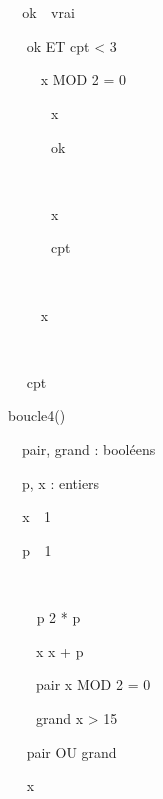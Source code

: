 {\sffamily
\texttt{\ \ }ok\texttt{
}\texttt{ }vrai}

{\sffamily
\ \  ok ET cpt {\textless} 3
}

{\sffamily
\ \ \ \  x MOD 2 = 0 }

{\sffamily
{\texttt{\ \ \ \ \ \ }}{x}{\texttt{
}}}

{\sffamily
{\texttt{\ \ \ \ \ \ }}{ok}{\texttt{
}}}

{\sffamily
\ \ \ \ }

{\sffamily
{\texttt{\ \ \ \ \ \ }}{x}{\texttt{
}}}

{\sffamily
{\texttt{\ \ \ \ \ \ }}{cpt}{\texttt{
}}}

{\sffamily
\ \ \ \ }

{\sffamily
\ \ \ \  x}

{\sffamily
\ \ }

{\sffamily
\ \  cpt}

{\sffamily
{} }


\bigskip

{\sffamily
{} boucle4()}

{\sffamily
\ \ pair, grand : booléens}

{\sffamily
\ \ p, x : entiers}

{\sffamily
\texttt{\ \ }x\texttt{
}\texttt{ }1}

{\sffamily
\texttt{\ \ }p\texttt{
}\texttt{ }1}

{\sffamily
\ \ }

{\sffamily
\texttt{\ \ \ \ }p  2 * p}

{\sffamily
\ \ \ \ x  x + p}

{\sffamily
\ \ \ \ pair  x MOD 2 = 0}

{\sffamily
\ \ \ \ grand  x
{\textgreater} 15}

{\sffamily
\ \  pair OU grand}

{\sffamily
\ \  x}

